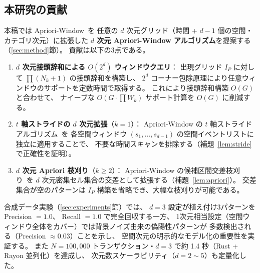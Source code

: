 \subsection{本研究の貢献}

本稿では Apriori-Window~\cite{aprioriwindow}を
任意の $d$ 次元グリッド（時間 + $d{-}1$ 個の空間・カテゴリ次元）に拡張した
\textbf{$d$ 次元 Apriori-Window アルゴリズム}を提案する（\ref{sec:method}節）。
貢献は以下の3点である。

\begin{enumerate}
\item \textbf{$d$ 次元接頭辞和による $O(2^d)$ ウィンドウクエリ}：
出現グリッド $I_P$ に対して $\prod (N_k{+}1)$ の接頭辞和を構築し、
$2^d$ コーナー包除原理により任意ウィンドウのサポートを定数時間で取得する。
これにより接頭辞和構築 $O(G)$ と合わせて、
ナイーブな $O(G \cdot \prod W_k)$ サポート計算を $O(G)$ に削減する。

\item \textbf{$t$ 軸ストライドの $d$ 次元拡張}（$k = 1$）：
Apriori-Window の $t$ 軸ストライドアルゴリズム~\cite{aprioriwindow}を
各空間ウィンドウ $(s_1, \ldots, s_{d-1})$ の空間イベントリストに独立に適用することで、
不要な時間スキャンを排除する（補題~\ref{lem:stride}で正確性を証明）。

\item \textbf{$d$ 次元 Apriori 枝刈り}（$k \geq 2$）：
Apriori-Window の候補区間交差枝刈り~\cite{aprioriwindow}を
$d$ 次元密集セル集合の交差として拡張する（補題~\ref{lem:apriori}）。
交差集合が空のパターンは $I_P$ 構築を省略でき、大幅な枝刈りが可能である。
\end{enumerate}

合成データ実験（\ref{sec:experiments}節）では、
$d{=}3$ 設定が植え付け3パターンを Precision $= 1.0$、
Recall $= 1.0$ で完全回収する一方、
1次元相当設定（空間ウィンドウ全体をカバー）では背景ノイズ由来の偽陽性パターンが
多数検出される（Precision $\approx 0.03$）ことを示し、
空間次元の明示的なモデル化の重要性を実証する。
また $N = 100{,}000$ トランザクション・$d{=}3$ で約 1.4 秒（Rust + Rayon 並列化）を達成し、
次元数スケーラビリティ（$d{=}2{\sim}5$）も定量化した。
